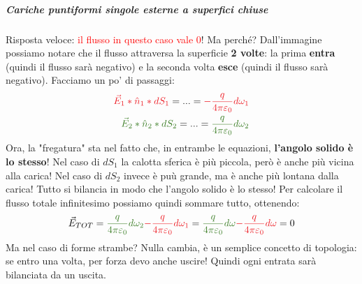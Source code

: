                 \subparagraph{Cariche puntiformi singole esterne a superfici chiuse}
                    Risposta veloce: \textcolor{Red}{il flusso in questo caso vale 0}! Ma perché?
                    Dall'immagine possiamo notare che il flusso attraversa la superficie \textbf{2 volte}: la prima \textbf{entra} (quindi il flusso sarà negativo) e la seconda volta \textbf{esce} (quindi il flusso sarà negativo). Facciamo un po' di passaggi:
                    \begin{align*}
                        \textcolor{Red}{\vec{E}_1*\hat{n}_1*dS_1} = ... = \textcolor{Red}{-\frac{q}{4\pi \varepsilon_0}d\omega_1}\\
                        \textcolor{OliveGreen}{\vec{E}_2*\hat{n}_2*dS_2} = ... = \textcolor{OliveGreen}{\frac{q}{4\pi \varepsilon_0}d\omega_2}
                    \end{align*}
                    Ora, la "fregatura" sta nel fatto che, in entrambe le equazioni, \textbf{l'angolo solido è lo stesso}! Nel caso di $dS_1$ la calotta sferica è più piccola, però è anche più vicina alla carica! Nel caso di $dS_2$ invece è puù grande, ma è anche più lontana dalla carica! Tutto si bilancia in modo che l'angolo solido è lo stesso! Per calcolare il flusso totale infinitesimo possiamo quindi sommare tutto, ottenendo:
                    \begin{align*}
                        \vec{E}_{TOT}=\textcolor{OliveGreen}{\frac{q}{4\pi \varepsilon_0}d\omega_2}\textcolor{Red}{-\frac{q}{4\pi \varepsilon_0}d\omega_1}=\textcolor{OliveGreen}{\frac{q}{4\pi \varepsilon_0}d\omega}\textcolor{Red}{-\frac{q}{4\pi \varepsilon_0}d\omega} = 0
                    \end{align*}
                    Ma nel caso di forme strambe?
                    Nulla cambia, è un semplice concetto di topologia: se entro una volta, per forza devo anche uscire! Quindi ogni entrata sarà bilanciata da un uscita.

